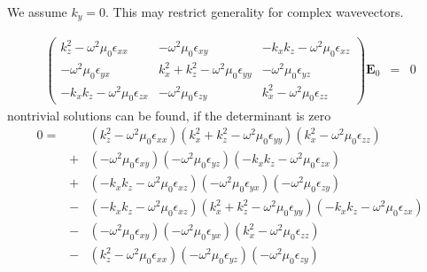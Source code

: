 \documentclass[12pt,a4paper,twoside,openright,BCOR10mm,headsepline,titlepage,abstracton,chapterprefix,final]{scrreprt}
\newcommand\Vector[1]{{\mathbf{#1}}}
\newcommand\vacuum{0}
\newcommand\wavenumber{k}
\newcommand\scalarEfield{E}
\newcommand\Efield{\Vector{\scalarEfield}}
\newcommand\vacuumpermeability{\mu_{\vacuum}}
\newcommand\scalarpermittivity{\epsilon}
\begin{document}
We assume $\wavenumber_y =0$.
This may restrict generality for complex wavevectors.

\begin{eqnarray}
\begin{pmatrix}
 \wavenumber_z^2 - \omega^2 \vacuumpermeability \scalarpermittivity_{xx} 
 &
 - \omega^2 \vacuumpermeability \scalarpermittivity_{xy}
 &
 - \wavenumber_x \wavenumber_z - \omega^2 \vacuumpermeability \scalarpermittivity_{xz}
 \\
 - \omega^2 \vacuumpermeability \scalarpermittivity_{yx}
 &
 \wavenumber_x^2 + \wavenumber_z^2 - \omega^2 \vacuumpermeability \scalarpermittivity_{yy} 
 &
 - \omega^2 \vacuumpermeability \scalarpermittivity_{yz}
 \\
 - \wavenumber_x \wavenumber_z - \omega^2 \vacuumpermeability \scalarpermittivity_{zx}
 &
 - \omega^2 \vacuumpermeability \scalarpermittivity_{zy}
 &
 \wavenumber_x^2 - \omega^2 \vacuumpermeability \scalarpermittivity_{zz}  
\end{pmatrix}
\Efield_0
&=& 0 \label{eq:generalDispersionEigenEquation}
\end{eqnarray}
nontrivial solutions can be found, if the determinant is zero
\begin{eqnarray}
 0 =&&
     ( \wavenumber_z^2 - \omega^2 \vacuumpermeability \scalarpermittivity_{xx} ) 
     ( \wavenumber_x^2 + \wavenumber_z^2 - \omega^2 \vacuumpermeability \scalarpermittivity_{yy} )
     ( \wavenumber_x^2 - \omega^2 \vacuumpermeability \scalarpermittivity_{zz} )
   \nonumber\\
   &+&
     ( - \omega^2 \vacuumpermeability \scalarpermittivity_{xy} )  
     ( - \omega^2 \vacuumpermeability \scalarpermittivity_{yz} )
     ( - \wavenumber_x \wavenumber_z - \omega^2 \vacuumpermeability \scalarpermittivity_{zx} )
   \nonumber\\
   &+&
     ( - \wavenumber_x \wavenumber_z - \omega^2 \vacuumpermeability \scalarpermittivity_{xz} )
     ( - \omega^2 \vacuumpermeability \scalarpermittivity_{yx} )
     ( - \omega^2 \vacuumpermeability \scalarpermittivity_{zy} )
   \nonumber\\
   &-&  
     ( - \wavenumber_x \wavenumber_z - \omega^2 \vacuumpermeability \scalarpermittivity_{xz} )
     (   \wavenumber_x^2 + \wavenumber_z^2 - \omega^2 \vacuumpermeability \scalarpermittivity_{yy} )
     ( - \wavenumber_x \wavenumber_z - \omega^2 \vacuumpermeability \scalarpermittivity_{zx} )
   \nonumber\\
   &-&
     ( - \omega^2 \vacuumpermeability \scalarpermittivity_{xy} )
     ( - \omega^2 \vacuumpermeability \scalarpermittivity_{yx} )
     (   \wavenumber_x^2 - \omega^2 \vacuumpermeability \scalarpermittivity_{zz} )
   \nonumber\\
   &-&
     (   \wavenumber_z^2 - \omega^2 \vacuumpermeability \scalarpermittivity_{xx} )
     ( - \omega^2 \vacuumpermeability \scalarpermittivity_{yz} )
     (  - \omega^2 \vacuumpermeability \scalarpermittivity_{zy} )
\end{eqnarray}
\end{document}
